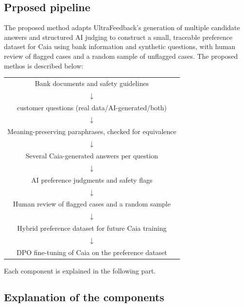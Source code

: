 \documentclass[11pt]{article}
\begin{document}
\subsection{Prposed pipeline}
The proposed method adapts UltraFeedback's generation of multiple candidate answers and structured AI judging \cite{ultra} to construct a small, traceable preference dataset for Caia using bank information and synthetic questions, with human review of flagged cases and a random sample of unflagged cases. The proposed methos is described below:

\begin{center}
\begin{tabular}{c}
Bank documents and safety guidelines\\ $\downarrow$\\
customer questions (real data/AI-generated/both)\\ $\downarrow$\\
Meaning-preserving paraphrases, checked for equivalence\\ $\downarrow$\\
Several Caia-generated answers per question\\ $\downarrow$\\
AI preference judgments and safety flags\\ $\downarrow$\\
Human review of flagged cases and a random sample\\ $\downarrow$\\
Hybrid preference dataset for future Caia training\\ $\downarrow$\\
DPO fine-tuning of Caia on the preference dataset
\end{tabular}
\end{center}
Each component is explained in the following part. 
\subsection{Explanation of the components}
\end{document}
